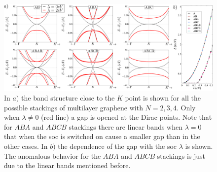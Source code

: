 \begin{figure}
\begin{minipage}{.9\linewidth}
\begin{center}
 \includegraphics[width=\textwidth]{chapter04/figures/bands.png}
\end{center}
\end{minipage}
\caption{ In $a)$ the band structure close to the $K$ point is shown for all the possible stackings of multilayer graphene with $N = {2,3,4}$. Only when $\lambda \neq 0$ (red line) a gap is opened at the Dirac points.
Note that for $ABA$ and $ABCB$ stackings there are linear bands when $\lambda=0$ that when the \ac{soc} is switched on cause a smaller gap than in the other cases.
In $b)$ the dependence of the gap with the \ac{soc} $\lambda$ is shown. The anomalous behavior for the $ABA$ and $ABCB$ stackings is just due to the linear bands mentioned before.}
\label{Bilayer}
\end{figure}

